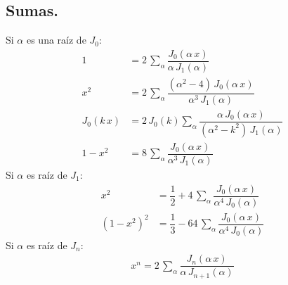 \subsection{Sumas.}
Si $\alpha$ es una raíz de $J_{0}$:
\begin{align*}
1 &= 2 \, \sum_{\alpha} \dfrac{J_{0} (\alpha \, x)}{\alpha \, J_{1} (\alpha)} \\[0.5em]
x^{2} &= 2 \, \sum_{\alpha} \dfrac{(\alpha^{2}- 4) \, J_{0} (\alpha \, x)}{\alpha^{3} \, J_{1} (\alpha)} \\[0.5em]
J_{0} (k \, x) &= 2 \, J_{0} (k) \sum_{\alpha} \dfrac{\alpha \, J_{0} (\alpha \, x)}{(\alpha^{2} - k^{2}) \, J_{1}(\alpha)} \\[0.5em]
1 -x^{2} &= 8 \, \sum_{\alpha} \dfrac{J_{0}(\alpha \, x)}{\alpha^{3} \, J_{1} (\alpha)}
\end{align*}
Si $\alpha$ es raíz de $J_{1}$:
\begin{align*}
x^{2} &= \dfrac{1}{2} + 4 \, \sum_{\alpha} \dfrac{J_{0} (\alpha \, x)}{\alpha^{4} \, J_{0} (\alpha)} \\[0.5em]
(1 - x^{2})^{2} &= \dfrac{1}{3} - 64 \, \sum_{\alpha} \dfrac{J_{0} (\alpha \, x)}{\alpha^{4} \, J_{0} (\alpha)}
\end{align*}
Si $\alpha$ es raíz de $J_{n}$:
\begin{align*}
x^{n} = 2 \, \sum_{\alpha} \dfrac{J_{n} (\alpha \, x)}{\alpha \, J_{n+1} (\alpha)}
\end{align*}
